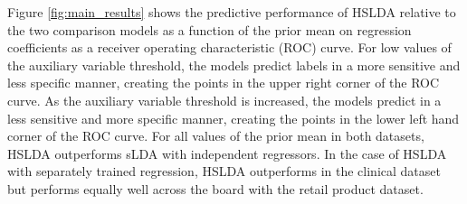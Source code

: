 Figure \ref{fig:main_results} shows the predictive performance of HSLDA 
relative to the two comparison models as a function of the prior mean
on regression coefficients as a receiver operating characteristic (ROC) curve. 
For low values of the auxiliary variable threshold, the models predict labels
in a more sensitive and less specific manner, creating the points in the upper
right corner of the ROC curve. As the auxiliary variable threshold is
increased, the models predict in a less sensitive and more specific manner,
creating the points in the lower left hand corner of the ROC curve. For all
values of the prior mean in both datasets, HSLDA outperforms sLDA with
independent regressors. In the case of HSLDA with separately trained
regression, HSLDA outperforms in the clinical dataset but performs equally well
across the board with the retail product dataset. 

